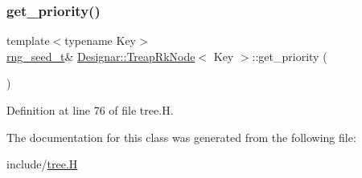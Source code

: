 \subsubsection{\texorpdfstring{get\+\_\+priority()}{get\_priority()}}
{\footnotesize\ttfamily template$<$typename Key$>$ \\
\hyperlink{namespace_designar_ad621b5646d45288c5d6a1e1dfe7531a8}{rng\+\_\+seed\+\_\+t}\& \hyperlink{class_designar_1_1_treap_rk_node}{Designar\+::\+Treap\+Rk\+Node}$<$ Key $>$\+::get\+\_\+priority (\begin{DoxyParamCaption}{ }\end{DoxyParamCaption})\hspace{0.3cm}{\ttfamily [inline]}}



Definition at line 76 of file tree.\+H.



The documentation for this class was generated from the following file\+:\begin{DoxyCompactItemize}
\item 
include/\hyperlink{tree_8_h}{tree.\+H}\end{DoxyCompactItemize}
